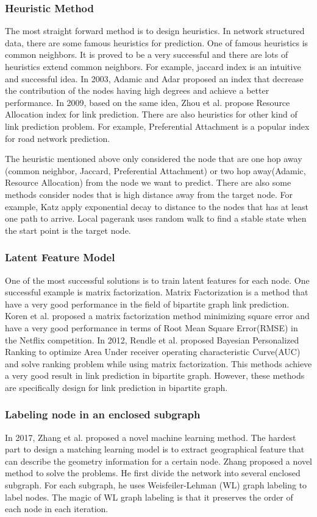 \documentclass[paper=letter, fontsize=12pt]{scrartcl} %
\begin{document}
\subsubsection{Heuristic Method}
The most straight forward method is to design heuristics.
In network structured data, there are some famous heuristics for prediction. One of famous heuristics is common neighbors. It is proved to be a very successful and there are lots of heuristics extend common neighbors. For example, jaccard index is an intuitive and successful idea. In 2003, Adamic and Adar \cite{adar} proposed an index that decrease the contribution of the nodes having high degrees and achieve a better performance. In 2009, based on the same idea, Zhou et al. \cite{ra} propose Resource Allocation index for link prediction. There are also heuristics for other kind of link prediction problem. For example, Preferential Attachment \cite{pa} is a popular index for road network prediction.

The heuristic mentioned above only considered the node that are one hop away (common neighbor, Jaccard, Preferential Attachment) or two hop away(Adamic, Resource Allocation) from the node we want to predict. There are also some methods consider nodes that is high distance away from the target node. For example, Katz \cite{katz} apply exponential decay to distance to the nodes that has at least one path to arrive. Local pagerank uses random walk to find a stable state when the start point is the target node.  

\subsubsection {Latent Feature Model}
One of the most successful solutions is to train latent features for each node. One successful example is matrix factorization. Matrix Factorization is a method that have a very good performance in the field of bipartite graph link prediction. Koren et al. proposed a matrix factorization \cite{mf} method minimizing square error and have a very good performance in terms of Root Mean Square Error(RMSE) in the Netflix competition. In 2012, Rendle et al. \cite{bprmf} proposed Bayesian Personalized Ranking to optimize Area Under receiver operating characteristic Curve(AUC) and solve ranking problem while using matrix factorization. This methods achieve a very good result in link prediction in bipartite graph. However, these methods are specifically design for link prediction in bipartite graph. 

\subsubsection {Labeling node in an enclosed subgraph}
In 2017, Zhang et al. proposed a novel machine learning method. The hardest part to design a matching learning model is to extract geographical feature that can describe the geometry information for a certain node. Zhang proposed a novel method to solve the problems. He first divide the network into several enclosed subgraph. For each subgraph, he uses Weisfeiler-Lehman (WL) graph labeling to label nodes. The magic of WL graph labeling is that it preserves the order of each node in each iteration.
\end{document}
